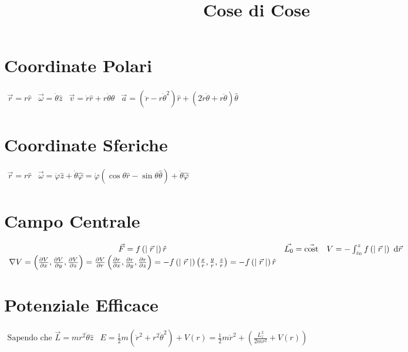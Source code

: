 \documentclass[a4paper,NoNotes,GeneralMath,12pt]{stdmdoc}
\newcommand\cost{\text{cost}}
\begin{document}
	\title{Cose di Cose}
	
	\section*{Coordinate Polari}
	$\begin{array}{cccc} \vec{r} = r\hat{r} & \vec{\omega} = \dot{\theta} \hat{z} & \vec{v} = \dot{r}\hat{r} + r\dot{\theta}\hat{\theta} & \vec{a} = \left(\ddot{r} - r{\dot{\theta}}^2\right)\hat{r} + \left(2\dot{r}\dot{\theta} + r\ddot{\theta}\right)\hat{\theta} \end{array}$

	\section*{Coordinate Sferiche}
	$\begin{array}{cc} \vec{r} = r\hat{r} & \vec{\omega} = \dot\varphi \hat{z} + \dot\theta \hat\varphi = \dot{\varphi} \left(\cos\theta \hat{r} - \sin\theta \hat{\theta}\right) + \dot{\theta} \hat{\varphi} \end{array}$

	\section*{Campo Centrale}
	$\begin{array}{ccc} \vec{F} = f\left(\mid \vec{r} \mid\right) \hat{r} & \vec{L_0} = \vec{\cost} & V = - \int_{z_0}^{z} f\left(\mid \vec{r} \mid\right) \de{\vec{r}} \\ \nabla V = \left(\dpar{V}{x}, \dpar{V}{y}, \dpar{V}{z}\right) = \dpar{V}{r} \left(\dpar{r}{x}, \dpar{r}{y}, \dpar{r}{z}\right) = - f\left(\mid \vec{r} \mid\right) \left(\frac{x}{r}, \frac{y}{r}, \frac{z}{r}\right) = - f\left(\mid \vec{r} \mid \right) \hat{r} \end{array}$

	\section*{Potenziale Efficace}
	$\begin{array}{cc} \text{Sapendo che } \vec{L} = mr^2 \dot{\theta} \hat{z} & E = \frac{1}{2} m\left({\dot{r}}^2 + r^2 {\dot{\theta}}^2\right) + V\left(r\right) = \frac{1}{2} m {\dot{r}}^2 + \left(\frac{L_z^2}{2mr^2} + V\left(r\right)\right) \end{array}$
\end{document}
